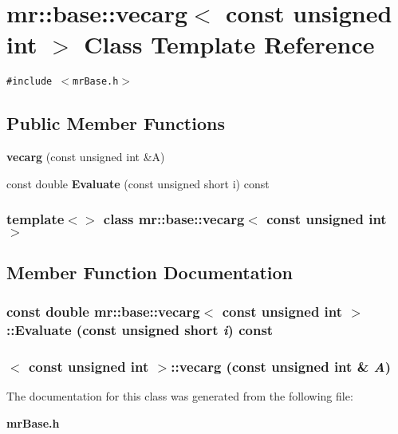 \section{mr::base::vecarg$<$ const unsigned int $>$ Class Template Reference}
\label{classmr_1_1base_1_1vecarg_3_01const_01unsigned_01int_01_4}
{\tt \#include $<$mr\-Base.h$>$}

\subsection*{Public Member Functions}
\begin{CompactItemize}
\item 
{\bf vecarg} (const unsigned int \&A)
\item 
const double {\bf Evaluate} (const unsigned short i) const 
\end{CompactItemize}
\subsubsection*{template$<$$>$ class mr::base::vecarg$<$ const unsigned int $>$}



\subsection{Member Function Documentation}
\subsubsection{\setlength{\rightskip}{0pt plus 5cm}const double {\bf mr::base::vecarg}$<$ const unsigned int $>$::Evaluate (const unsigned short {\em i}) const\hspace{0.3cm}{\tt  [inline]}}\label{classmr_1_1base_1_1vecarg_3_01const_01unsigned_01int_01_4_a1}


\subsubsection{$<$ const unsigned int $>$::{\bf vecarg} (const unsigned int \& {\em A})\hspace{0.3cm}{\tt  [inline]}}\label{classmr_1_1base_1_1vecarg_3_01const_01unsigned_01int_01_4_a0}




The documentation for this class was generated from the following file:\begin{CompactItemize}
\item 
{\bf mr\-Base.h}\end{CompactItemize}
